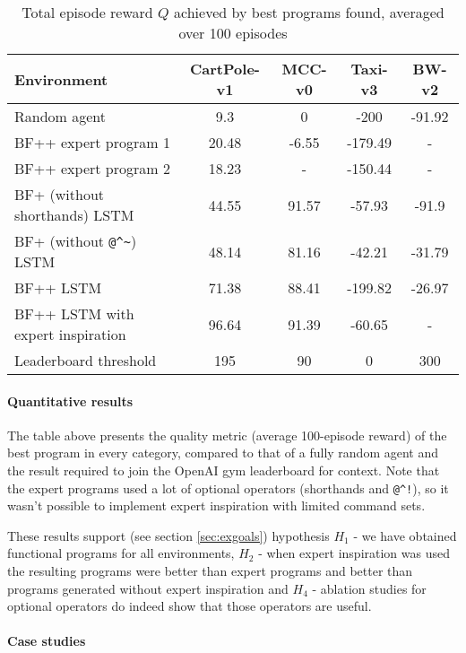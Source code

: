 \begin{table}[H]
  \caption{Total episode reward $Q$ achieved by best programs found, averaged over 100 episodes}
  \label{tab:quality}
  \centering
  \begin{tabular}{lcccc}
    Environment     & CartPole-v1     & MCC-v0 & Taxi-v3 & BW-v2 \\
    \midrule
    Random agent & 9.3 & 0 & -200 & -91.92  \\
    \midrule
    BF++ expert program 1 & 20.48 & -6.55 & -179.49 & - \\
    BF++ expert program 2 & 18.23 & - & -150.44 & - \\
    BF+ (without shorthands) LSTM & 44.55 & 91.57 & -57.93 & -91.9 \\
    BF+ (without \verb|@^~|) LSTM & 48.14 & 81.16 & -42.21 & -31.79 \\
    BF++ LSTM     & 71.38 & 88.41 & -199.82 & -26.97 \\
    BF++ LSTM with expert inspiration  & 96.64 & 91.39 & -60.65 & - \\
    \midrule
    Leaderboard threshold & 195 & 90 & 0 & 300 \\
    \bottomrule
  \end{tabular}
\end{table}

\paragraph{Quantitative results}

The table above presents the quality metric (average 100-episode reward) of the best program in every category, compared to that of a fully random agent and the result required to join the OpenAI gym leaderboard for context.
Note that the expert programs used a lot of optional operators (shorthands and \verb|@^!|), so it wasn't possible to implement expert inspiration with limited command sets.

These results support (see section \ref{sec:exgoals}) hypothesis $H_1$ - we have obtained functional programs for all environments, $H_2$ - when expert inspiration was used the resulting programs were better than expert programs and better than programs generated without expert inspiration and $H_4$ - ablation studies for optional operators do indeed show that those operators are useful.

\paragraph{Case studies}
\label{sec:casestudies}

